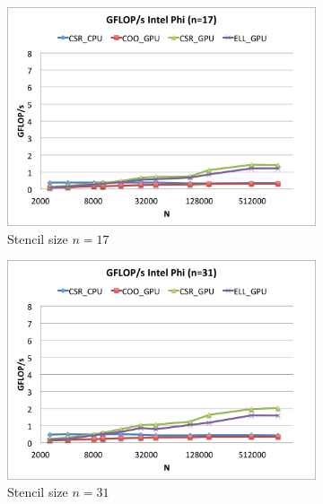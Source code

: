 \documentclass{report}
\begin{document}
\begin{figure} 
\centering
\begin{subfigure}[t]{0.48\textwidth}
\centering
\includegraphics[width=\textwidth]{gpu_content/cascade_spmv/gflops_cascade_intel_phi_n17.png}
\caption{Stencil size $n=17$}
\label{fig:gflops_cascade_intel_phi_n17}
\end{subfigure}
\quad
\begin{subfigure}[t]{0.48\textwidth}
\centering
\includegraphics[width=\textwidth]{gpu_content/cascade_spmv/gflops_cascade_intel_phi_n31.png}
\caption{Stencil size $n=31$}
\label{fig:gflops_cascade_intel_phi_n31}
\end{subfigure}
\begin{subfigure}[t]{0.48\textwidth}
\centering

\end{subfigure}
\end{figure}
\end{document}

